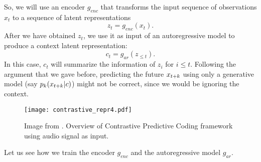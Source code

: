 So, we will use an encoder $g_{enc}$ that transforms the input sequence of observations $x_t$ to a sequence of latent representations
$$
z_t = g_{enc}(x_t).
$$
After we have obtained $z_t$, we use it as input of an autoregressive model to produce a context latent representation:
$$
c_t = g_{ar}(z_{\leq t}).
$$
In this case, $c_t$ will summarize the information of $z_i$ for $i \leq t$. Following the argument that we gave before, predicting the future $x_{t+k}$ using only a generative model (say $p_k(x_{t+k}|c)$)
might not be correct, since we would be ignoring the context. \\

\begin{figure}[H]
    \centering 
    \texttt{[image: contrastive\_repr4.pdf]}
    \caption{Image from \citep{oord_representation_2019}. Overview of Contrastive Predictive Coding framework using audio signal as input. }
\end{figure}



Let us see how we train the encoder $g_{enc}$ and the autoregressive model $g_{ar}$.\\